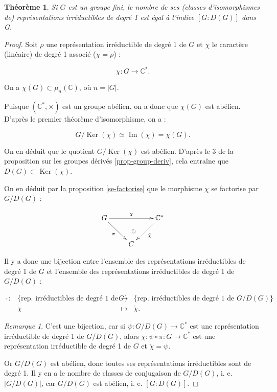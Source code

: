 \documentclass[french]{book}
\newtheorem{prototheorem}{Théorème}[section]
\newenvironment{thm}
   {\colorlet{shadecolor}{orange!10}\begin{shaded}\begin{prototheorem}}
   {\end{prototheorem}\end{shaded}}
\theoremstyle{definition}
\theoremstyle{remark}
\newtheorem*{remark}{Remarque}
\begin{document}
\begin{thm}\label{nb-rep-deg-1}
  Si \(G\) est un groupe fini, le nombre de ses (classes d'isomorphismes de) représentations irréductibles de degré 1 est égal à l'indice \([G:D(G)]\) dans G.
\end{thm}

\begin{proof}
  Soit \(\rho\) une représentation irréductible de degré 1 de \(G\) et \(\chi\) le caractère (linéaire) de degré 1 associé (\(\chi = \rho\)) :

  \[\chi : G \longrightarrow \mathbb{C} ^{*}.\]

  On a \(\chi(G) \subset \mu_n(\mathbb{C})\), où \(n=\left\lvert G \right\rvert\).

  Puisque \((\mathbb{C}^{*}, \times)\) est un groupe abélien, on a donc que \(\chi(G)\) est abélien. D'après le premier théorème d'isomorphisme, on a :

  \[G/ \operatorname{Ker}(\chi) \simeq \operatorname{Im}(\chi) = \chi(G).\]

  On en déduit que le quotient \(G/\operatorname{Ker}(\chi)\) est abélien. D'après le 3 de la proposition sur les groupes dérivés \ref{prop-group-deriv}, cela entraîne que \(D(G) \subset \operatorname{Ker}(\chi)\).

  On en déduit par la proposition \ref{se-factorise} que le morphisme \(\chi\) se factorise par \(G/D(G)\) :

  \begin{equation*}
    \xymatrix{
    G\ar[rr]^-{\chi}\ar[dr]_-{\pi}&\ar@{}@<0.8ex>[d]|{\circlearrowright}&\mathbb{C}^{*}\ar@{.>}[dl]^-{\check{\chi}}\\
    &C&
    }
  \end{equation*}

  Il y a donc une bijection entre l'ensemble des représentations irréductibles de degré 1 de \(G\) et l'ensemble des représentations irréductibles de degré 1 de \(G/D(G)\) :

  \[\begin{matrix}
  \check{ \ } : & \{ \text{rep. irréductibles de degré 1 de } G \}& \longrightarrow & \{ \text{rep. irréductibles de degré 1 de } G/D(G) \}\\
  \ & \chi & \longmapsto & \check{\chi}.
  \end{matrix}\]

  \begin{remark}
    C'est une bijection, car si \(\psi : G/D(G) \longrightarrow \mathbb{C} ^{*}\) est une représentation irréductible de degré 1 de \(G/D(G)\), alors \(\chi : \psi \circ \pi : G \longrightarrow \mathbb{C}^{*}\) est une représentation irréductible de degré 1 de \(G\) et \(\check{\chi} = \psi\).
  \end{remark}

  Or \(G/D(G)\) est abélien, donc toutes ses représentations irréductibles sont de degré 1. Il y en a le nombre de classes de conjugaison de \(G/D(G)\), i. e. \(\left\lvert G/D(G) \right\rvert\), car \(G/D(G)\) est abélien, i. e. \([G : D(G)]\).
\end{proof}
\end{document}
